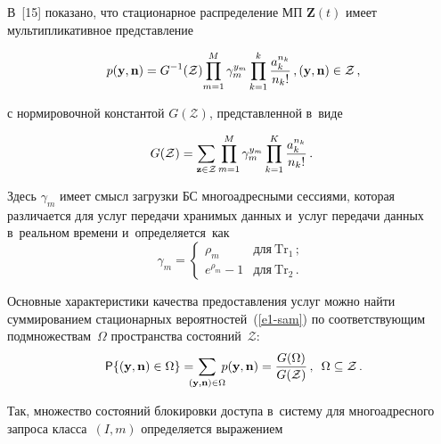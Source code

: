 \begin{multicols}{2}
  В~[15] показано, что стационарное распределение МП $\mathbf{Z}(t)$ имеет 
мультипликативное пред\-став\-ление

\noindent
  \begin{equation}
  p(\mathbf{y},\mathbf{n}) =G^{-1}(\mathcal{Z}) \!\prod\limits^M_{m=1} 
\gamma_m^{y_m} \prod\limits^k_{k=1} \displaystyle\frac{\displaystyle a_k^{n_k}\mathstrut}{\displaystyle n_k!\mathstrut}\,, \\
  (\mathbf{y},\mathbf{n})\in \mathcal{Z}\,,
  \label{e1-sam}\!\!
  \end{equation}
  
    \vspace*{-2pt}
    
    \noindent
с нормировочной константой $G(\mathcal{Z})$, пред\-став\-лен\-ной в~виде

\vspace*{1pt}

\noindent
$$
G(\mathcal{Z}) =\sum\limits_{\mathbf{z}\in\mathcal{Z}} \prod\limits^M_{m=1} 
\gamma_m^{y_m} \prod\limits^K_{k=1} \displaystyle\frac{\displaystyle a_k^{n_k}\mathstrut}{\displaystyle n_k !\mathstrut}\,.
$$

  \vspace*{-1pt}

\noindent
Здесь $\gamma_m$ имеет смысл загрузки БС многоадресными 
сессиями, которая различается для услуг передачи хранимых данных и~услуг 
передачи данных в~реальном времени и~опре\-де\-ля\-ет\-ся~как 
$$
\gamma_m= \begin{cases}
\rho_m & \mbox{для}\ \mathrm{Tr}_1\,;\\
e^{\rho_m}-1 &\mbox{для}\ \mathrm{Tr}_2\,.
\end{cases}
$$

  \vspace*{-2pt}
  
  Основные характеристики качества предостав\-ле\-ния услуг мож\-но найти 
суммированием стационарных вероятностей~(\ref{e1-sam}) по со\-от\-вет\-ст\-ву\-ющим 
подмножествам~$\Omega$ пространства со\-сто\-яний~$\mathcal{Z}$:
  \begin{equation}
  {\sf P}\{ (\mathbf{y},\mathbf{n})\in \Omega\} =\!\!\!\!\sum\limits_{(\mathbf{y},\mathbf{n}) 
\in \Omega} \!\!\! p(\mathbf{y},\mathbf{n})= \fr{G(\Omega)}{G(\mathcal{Z})}\,,\enskip 
\Omega\subseteq \mathcal{Z}\,.\!\!
\label{e2-sam}
  \end{equation}
  
  \vspace*{-2pt}

  Так, множество состояний блокировки доступа в~сис\-те\-му для 
многоадресного запроса класса~$({I},m)$ определяется выражением


\end{multicols}
